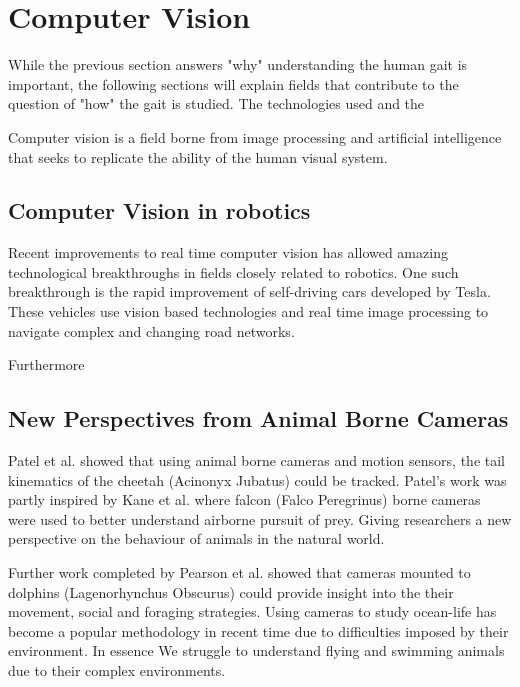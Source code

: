 \section{Computer Vision}
While the previous section answers "why" understanding the human gait is important, the following sections will explain fields that contribute to the question of "how" the gait is studied. The technologies used and the 

Computer vision is a field borne from image processing and artificial intelligence that seeks to replicate the ability of the human visual system.   







\subsection{Computer Vision in robotics}
Recent improvements to real time computer vision has allowed amazing technological breakthroughs in fields closely related to robotics. One such breakthrough is the rapid improvement of self-driving cars developed by Tesla. These vehicles use vision based technologies and real time image processing to navigate complex and changing road networks. 

Furthermore 










\subsection{New Perspectives from Animal Borne Cameras}
Patel et al. \cite{patel2017trackingieee} showed that using animal borne cameras and motion sensors, the tail kinematics of the cheetah (Acinonyx Jubatus) could be tracked. Patel's work was partly inspired by Kane et al. \cite{kane2014falcons} where falcon (Falco Peregrinus) borne cameras were used to better understand airborne pursuit of prey. Giving researchers a new perspective on the behaviour of animals in the natural world.

Further work completed by Pearson et al. \cite{pearson2017testing} showed that cameras mounted to dolphins (Lagenorhynchus Obscurus) could provide insight into the their movement, social and foraging strategies. Using cameras to study ocean-life has become a popular methodology in recent time due to difficulties imposed by their environment. In essence We struggle to understand flying and swimming animals due to their complex environments.   









